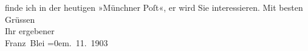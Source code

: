 \begin{ledgroupsized}[t]{13cm}
                    finde ich in der heutigen »Münchner Poſt«, er
                    wird Sie interessieren.\pend
           \pstart
           Mit besten Grüssen{\\[\baselineskip]}Ihr ergebener{\\[\baselineskip]}\spacefill\mbox{Franz Blei}\pend
           \leftskip=0em{}. 11. 1903\pend
           \endnumbering{}\end{ledgroupsized}  \newcommand{\dateiname}{L01346}\newcommand{\titel}{Franz Blei an Arthur Schnitzler, 25. 11. 1903}\newcommand{\editorInnen}{Martin Anton Müller und Gerd-Hermann Susen}
      